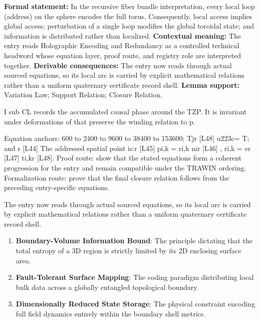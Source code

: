 \begingroup\footnotesize\setlength{\emergencystretch}{3em}\sloppy
\textbf{Formal statement:} In the recursive fiber bundle interpretation, every local loop (address) on the sphere encodes the full torus. Consequently, local access implies global access; perturbation of a single loop modifies the global toroidal state; and information is distributed rather than localized. \textbf{Contextual meaning:} The entry reads Holographic Encoding and Redundancy as a controlled technical headword whose equation layer, proof route, and registry role are interpreted together. \textbf{Derivable consequences:} The entry now reads through actual sourced equations, so its local arc is carried by explicit mathematical relations rather than a uniform quaternary certificate record shell. \textbf{Lemma support:} Variation Law; Support Relation; Closure Relation.\par
\endgroup

I sub CL records the accumulated causal phase around the TZP. It is invariant under deformations of that preserve the winding relation to p.

Equation anchors: 600 to 2400 to 9600 to 38400 to 153600; Tjr [L48] u223c= T; and r [L44] The addressed spatial point is:r [L45] pi,k = ri,k nir [L46] , ri,k = er [L47] ti,kr [L48]. Proof route: show that the stated equations form a coherent progression for the entry and remain compatible under the TRAWIN ordering. Formalization route: prove that the final closure relation follows from the preceding entry-specific equations.

The entry now reads through actual sourced equations, so its local arc is carried by explicit mathematical relations rather than a uniform quaternary certificate record shell.
\endgroup

\begin{enumerate}[leftmargin=1.6em,itemsep=6pt,topsep=4pt]
\item \textbf{Boundary-Volume Information Bound}: The principle dictating that the total entropy of a 3D region is strictly limited by its 2D enclosing surface area.
\item \textbf{Fault-Tolerant Surface Mapping}: The coding paradigm distributing local bulk data across a globally entangled topological boundary.
\item \textbf{Dimensionally Reduced State Storage}: The physical constraint encoding full field dynamics entirely within the boundary shell metrics.
\end{enumerate}


